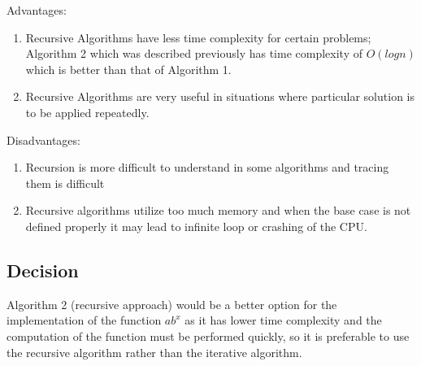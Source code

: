 \documentclass[12pt, a4paper]{article}
\begin{document}
Advantages:
\begin{enumerate}
    \item {Recursive Algorithms have less time complexity for certain problems;  Algorithm 2 which was described previously has time complexity of $O(logn)$ which is better than that of Algorithm 1.}
    \item {Recursive Algorithms are very useful in situations where particular solution is to be applied repeatedly.}
    
\end{enumerate}

Disadvantages:
\begin{enumerate}
    \item {Recursion is more difficult to understand in some algorithms and tracing them is difficult}
    \item {Recursive algorithms utilize too much memory and when the base case is not defined properly it may lead to infinite loop or crashing of the CPU.}
    
\end{enumerate}

\subsection*{Decision}
Algorithm 2 (recursive approach) would be a better option for the implementation of the function $ab^x$ as it has lower time complexity and the computation of the function must be performed quickly, so it is preferable to use the recursive algorithm rather than the iterative algorithm.
\end{document}
